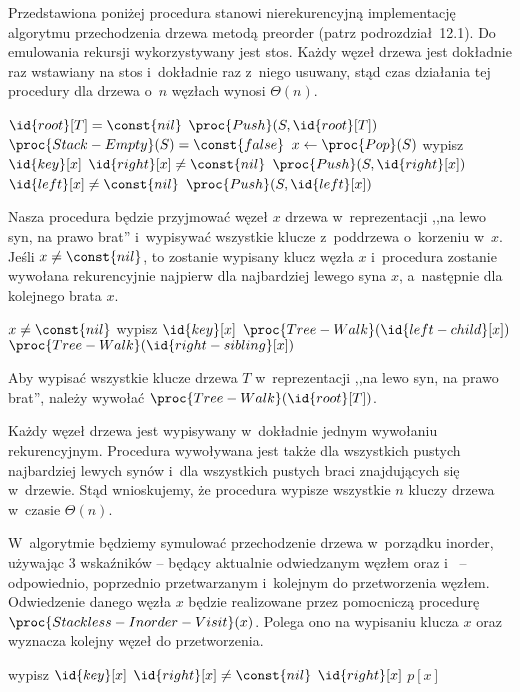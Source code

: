 \exercise %
Przedstawiona poniżej procedura stanowi nierekurencyjną implementację algorytmu przechodzenia drzewa metodą preorder (patrz podrozdział~12.1). Do emulowania rekursji wykorzystywany jest stos. Każdy węzeł drzewa jest dokładnie raz wstawiany na stos i~dokładnie raz z~niego usuwany, stąd czas działania tej procedury dla drzewa o~$n$ węzłach wynosi $\Theta(n)$.
\begin{codebox}
\li	\If $\id{root}[T]=\const{nil}$
\li		\Then \Return
		\End
\li	$\proc{Push}(S,\id{root}[T])$
\li	\While $\proc{Stack-Empty}(S)=\const{false}$
\li		\Do
			$x\gets\proc{Pop}(S)$
\li			wypisz $\id{key}[x]$
\li			\If $\id{right}[x]\ne\const{nil}$
\li				\Then $\proc{Push}(S,\id{right}[x])$
				\End
\li			\If $\id{left}[x]\ne\const{nil}$
\li				\Then $\proc{Push}(S,\id{left}[x])$
				\End
		\End
\end{codebox}

\exercise %
Nasza procedura będzie przyjmować węzeł $x$ drzewa w~reprezentacji ,,na lewo syn, na prawo brat'' i~wypisywać wszystkie klucze z~poddrzewa o~korzeniu w~$x$. Jeśli $x\ne\const{nil}$, to zostanie wypisany klucz węzła $x$ i~procedura zostanie wywołana rekurencyjnie najpierw dla najbardziej lewego syna $x$, a~następnie dla kolejnego brata $x$.
\begin{codebox}
\li	\If $x\ne\const{nil}$
\li		\Then
			wypisz $\id{key}[x]$
\li			$\proc{Tree-Walk}(\id{left-child}[x])$
\li			$\proc{Tree-Walk}(\id{right-sibling}[x])$
		\End
\end{codebox}
Aby wypisać wszystkie klucze drzewa $T$ w~reprezentacji ,,na lewo syn, na prawo brat'', należy wywołać $\proc{Tree-Walk}(\id{root}[T])$.

Każdy węzeł drzewa jest wypisywany w~dokładnie jednym wywołaniu rekurencyjnym. Procedura wywoływana jest także dla wszystkich pustych najbardziej lewych synów i~dla wszystkich pustych braci znajdujących się w~drzewie. Stąd wnioskujemy, że procedura wypisze wszystkie $n$ kluczy drzewa w~czasie $\Theta(n)$.

\exercise %
W~algorytmie będziemy symulować przechodzenie drzewa w~porządku inorder, używając 3 wskaźników --  będący aktualnie odwiedzanym węzłem oraz  i~ -- odpowiednio, poprzednio przetwarzanym i~kolejnym do przetworzenia węzłem. Odwiedzenie danego węzła $x$ będzie realizowane przez pomocniczą procedurę $\proc{Stackless-Inorder-Visit}(x)$. Polega ono na wypisaniu klucza $x$ oraz wyznacza kolejny węzeł do przetworzenia.
\begin{codebox}
\li	wypisz $\id{key}[x]$
\li	\If $\id{right}[x]\ne\const{nil}$
\li		\Then \Return $\id{right}[x]$
\li		\Else \Return $p[x]$
		\End
\end{codebox}

